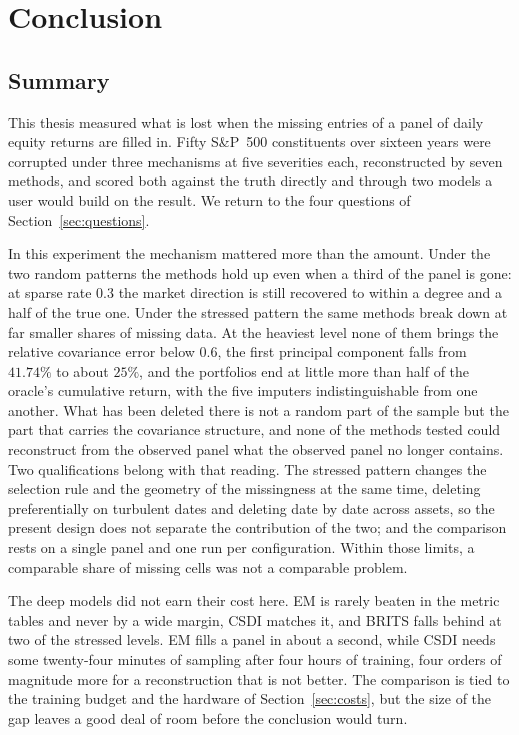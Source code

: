 \chapter{Conclusion}
\label{ch:conclusion}

\section{Summary}

This thesis measured what is lost when the missing entries of a panel of daily
equity returns are filled in. Fifty S\&P~500 constituents over sixteen years
were corrupted under three mechanisms at five severities each, reconstructed by
seven methods, and scored both against the truth directly and through two models
a user would build on the result. We return to the four questions of
Section~\ref{sec:questions}.

In this experiment the mechanism mattered more than the amount. Under the two
random patterns the methods hold up even when a third of the panel is gone: at
sparse rate $0.3$ the market direction is still recovered to within a degree and
a half of the true one. Under the stressed pattern the same methods break down at
far smaller shares of missing data. At the heaviest level none of them brings the
relative covariance error below $0.6$, the first principal component falls from
$41.74\%$ to about $25\%$, and the portfolios end at little more than half of
the oracle's cumulative return, with the five imputers indistinguishable from one
another. What has been deleted there is not a random part of the sample but the
part that carries the covariance structure, and none of the methods tested could
reconstruct from the observed panel what the observed panel no longer contains.
Two qualifications belong with that reading. The stressed pattern changes the
selection rule and the geometry of the missingness at the same time, deleting
preferentially on turbulent dates and deleting date by date across assets, so the
present design does not separate the contribution of the two; and the comparison
rests on a single panel and one run per configuration. Within those limits, a
comparable share of missing cells was not a comparable problem.

The deep models did not earn their cost here. EM is rarely beaten in the metric
tables and never by a wide margin, CSDI matches it, and BRITS falls behind at two
of the stressed levels. EM fills a panel in about a second, while CSDI needs some
twenty-four minutes of sampling after four hours of training, four orders of
magnitude more for a reconstruction that is not better. The comparison is tied
to the training budget and the hardware of Section~\ref{sec:costs}, but the size
of the gap leaves a good deal of room before the conclusion would turn.

